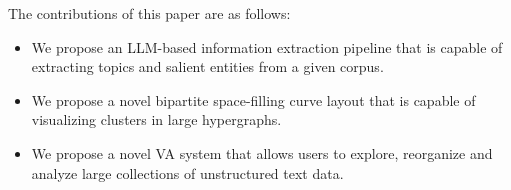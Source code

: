The contributions of this paper are as follows:
\begin{itemize}
    \item We propose an LLM-based information extraction pipeline that is capable of extracting topics and salient entities from a given corpus.
    \item We propose a novel bipartite space-filling curve layout that is capable of visualizing clusters in large hypergraphs.
    \item We propose a novel VA system that allows users to explore, reorganize and analyze large collections of unstructured text data.
\end{itemize}










